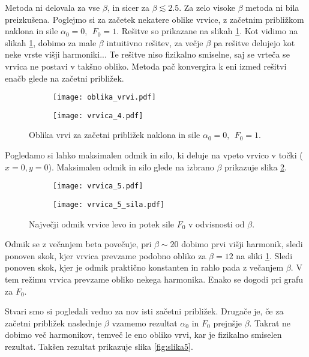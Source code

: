 \documentclass[12pt,a4paper]{article}
\begin{document}
Metoda ni delovala za vse $\beta$, in sicer za $\beta \lesssim 2.5$. Za zelo visoke $\beta$ metoda ni bila preizkušena. Poglejmo si za začetek nekatere oblike vrvice, z začetnim približkom naklona in sile $\alpha_0=0, \ \ F_0=1$. Rešitve so prikazane na slikah \ref{fig:slika3}. Kot vidimo na slikah \ref{fig:slika3}, dobimo za male $\beta$ intuitivno rešitev, za večje $\beta$ pa rešitve delujejo kot neke vrste višji harmoniki... Te rešitve niso fizikalno smiselne, saj se vrteča se vrvica ne postavi v takšno obliko. Metoda  pač konvergira k eni izmed rešitvi enačb glede na začetni približek.
\begin{figure}[H]
    \centering
    \begin{subfigure}[b]{0.45\textwidth}  			
        \texttt{[image: oblika\_vrvi.pdf]}
    \end{subfigure}
    \begin{subfigure}[b]{0.45\textwidth}  			
        \texttt{[image: vrvica\_4.pdf]}
    \end{subfigure}
    \caption{Oblika vrvi za začetni približek naklona in sile $\alpha_0=0, \ \ F_0=1$. } \label{fig:slika3}
\end{figure} 
\noindent Pogledamo si lahko maksimalen odmik in silo, ki deluje na vpeto vrvico v točki ($x=0,y=0$). Maksimalen odmik in silo glede na izbrano $\beta$ prikazuje slika \ref{fig:slika4}.

\begin{figure}[H]
    \centering
    \begin{subfigure}[b]{0.45\textwidth}  			
        \texttt{[image: vrvica\_5.pdf]}
    \end{subfigure}
    \begin{subfigure}[b]{0.45\textwidth}  			
        \texttt{[image: vrvica\_5\_sila.pdf]}
    \end{subfigure}
    \caption{Največji odmik vrvice levo in potek sile $F_0$ v odvisnosti od $\beta$.} 
    \label{fig:slika4}
\end{figure}

\noindent Odmik se z večanjem beta povečuje, pri $\beta \sim 20$ dobimo prvi višji harmonik, sledi ponoven skok, kjer vrvica prevzame podobno obliko za $\beta=12$ na sliki \ref{fig:slika3}. Sledi ponoven skok, kjer je odmik praktično konstanten in rahlo pada z večanjem $\beta$. V tem režimu vrvica prevzame obliko nekega harmonika. Enako se dogodi pri grafu za $F_0$.

Stvari smo si pogledali vedno za nov isti začetni približek. Drugače je, če za začetni približek naslednje $\beta$ vzamemo rezultat $\alpha_0$ in $F_0$ prejnšje $\beta$. Takrat ne dobimo več harmonikov, temveč le eno obliko vrvi, kar je fizikalno smiselen rezultat. Takšen rezultat prikazuje slika \ref{fig:slika5}.
\end{document}
